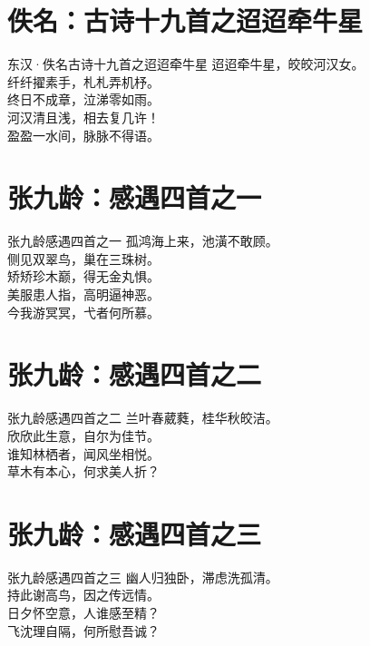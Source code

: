 \documentclass[12pt,oneside,a5paper]{book}
\begin{document}
\chapter{佚名：古诗十九首之迢迢牵牛星}
\begin{poemzh}{东汉·佚名}{古诗十九首之迢迢牵牛星}
迢迢牵牛星，皎皎河汉女。\\
纤纤擢素手，札札弄机杼。\\ 
终日不成章，泣涕零如雨。\\
河汉清且浅，相去复几许！\\ 
盈盈一水间，脉脉不得语。\\
\end{poemzh}

\chapter{张九龄：感遇四首之一}
\begin{poemzh}{张九龄}{感遇四首之一}
孤鸿海上来，池潢不敢顾。\\
侧见双翠鸟，巢在三珠树。\\
矫矫珍木巅，得无金丸惧。\\
美服患人指，高明逼神恶。\\
今我游冥冥，弋者何所慕。\\ 
\end{poemzh}

\chapter{张九龄：感遇四首之二}
\begin{poemzh}{张九龄}{感遇四首之二}
兰叶春葳蕤，桂华秋皎洁。\\
欣欣此生意，自尔为佳节。\\
谁知林栖者，闻风坐相悦。\\
草木有本心，何求美人折？\\ 
\end{poemzh}
  


\chapter{张九龄：感遇四首之三}
\begin{poemzh}{张九龄}{感遇四首之三}
幽人归独卧，滞虑洗孤清。\\
持此谢高鸟，因之传远情。\\
日夕怀空意，人谁感至精？\\
飞沈理自隔，何所慰吾诚？\\ 
\end{poemzh}
\end{document}
